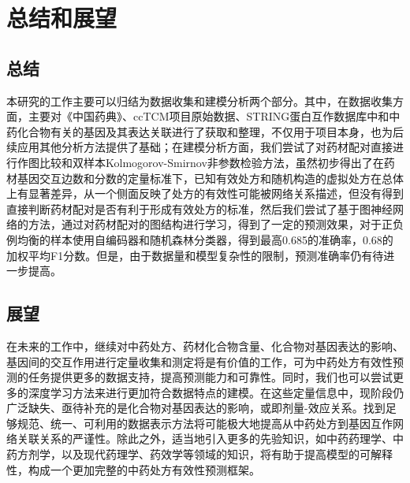 
\chapter{总结和展望}

\section{总结}

本研究的工作主要可以归结为数据收集和建模分析两个部分。其中，在数据收集方面，主要对《中国药典》、ccTCM项目原始数据、STRING蛋白互作数据库中和中药化合物有关的基因及其表达关联进行了获取和整理，不仅用于项目本身，也为后续应用其他分析方法提供了基础；在建模分析方面，我们尝试了对药材配对直接进行作图比较和双样本Kolmogorov-Smirnov非参数检验方法，虽然初步得出了在药材基因交互边数和分数的定量标准下，已知有效处方和随机构造的虚拟处方在总体上有显著差异，从一个侧面反映了处方的有效性可能被网络关系描述，但没有得到直接判断药材配对是否有利于形成有效处方的标准，然后我们尝试了基于图神经网络的方法，通过对药材配对的图结构进行学习，得到了一定的预测效果，对于正负例均衡的样本使用自编码器和随机森林分类器，得到最高0.685的准确率，0.68的加权平均F1分数。但是，由于数据量和模型复杂性的限制，预测准确率仍有待进一步提高。

\section{展望}

在未来的工作中，继续对中药处方、药材化合物含量、化合物对基因表达的影响、基因间的交互作用进行定量收集和测定将是有价值的工作，可为中药处方有效性预测的任务提供更多的数据支持，提高预测能力和可靠性。同时，我们也可以尝试更多的深度学习方法来进行更加符合数据特点的建模。在这些定量信息中，现阶段仍广泛缺失、亟待补充的是化合物对基因表达的影响，或即剂量-效应关系。找到足够规范、统一、可利用的数据表示方法将可能极大地提高从中药处方到基因互作网络关联关系的严谨性。除此之外，适当地引入更多的先验知识，如中药药理学、中药方剂学，以及现代药理学、药效学等领域的知识，将有助于提高模型的可解释性，构成一个更加完整的中药处方有效性预测框架。